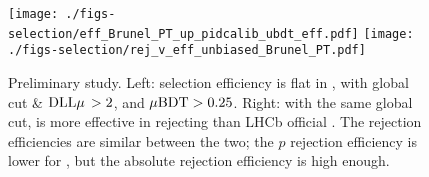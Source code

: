 \begin{figure}[htb]
    \centering
    \texttt{[image: ./figs-selection/eff\_Brunel\_PT\_up\_pidcalib\_ubdt\_eff.pdf]}
    \hspace{1em}
    \texttt{[image: ./figs-selection/rej\_v\_eff\_unbiased\_Brunel\_PT.pdf]}

    \caption{
        Preliminary \UBDT study.
        Left: \UBDT \muon selection efficiency is flat in \pt, with
        global cut \isMuon \& $\text{\PID{\muon}}\! > 2$,
        and $\mu\text{BDT} > 0.25$.
        Right: with the same global cut, \UBDT is more effective in rejecting
        \pion than LHCb official \ProbNN{\muon}.
        The \kaon rejection efficiencies are similar between the two;
        the $p$ rejection efficiency is lower for \UBDT, but the absolute
        rejection efficiency is high enough.
    }
    \label{fig:ubdt-eff}
\end{figure}
